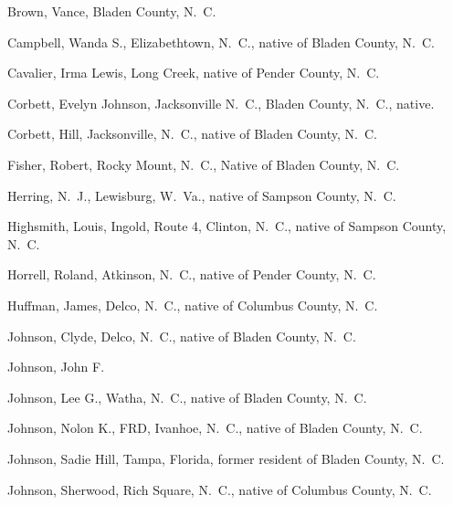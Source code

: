 \documentclass[11pt, a5paper, openright]{book}
\begin{document}
\begin{thebibliography}{99}
  Brown, Vance, Bladen County, N.~C.

  Campbell, Wanda S., Elizabethtown, N.~C., native of Bladen County, N.~C.

  Cavalier, Irma Lewis, Long Creek, native of Pender County, N.~C.

  Corbett, Evelyn Johnson, Jacksonville N.~C., Bladen County, N.~C., native.

  Corbett, Hill, Jacksonville, N.~C., native of Bladen County, N.~C.

  Fisher, Robert, Rocky Mount, N.~C., Native of Bladen County, N.~C.

  Herring, N.~J., Lewisburg, W.~Va., native of Sampson County, N.~C.

  Highsmith, Louis, Ingold, Route 4, Clinton, N.~C., native of Sampson
  County, N.~C.

  Horrell, Roland, Atkinson, N.~C., native of Pender County, N.~C.

  Huffman, James, Delco, N.~C., native of Columbus County, N.~C.

  Johnson, Clyde, Delco, N.~C., native of Bladen County, N.~C.

  Johnson, John F.

  Johnson, Lee G., Watha, N.~C., native of Bladen County, N.~C.

  Johnson, Nolon K., FRD, Ivanhoe, N.~C., native of Bladen County, N.~C.

  Johnson, Sadie Hill, Tampa, Florida, former resident of Bladen County, N.~C.

  Johnson, Sherwood, Rich Square, N.~C., native of Columbus County, N.~C.


\end{thebibliography}
\end{document}
